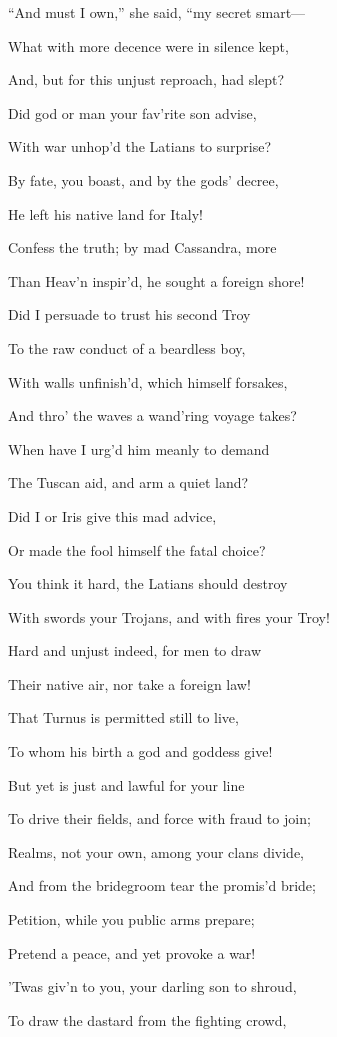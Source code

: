 “And must I own,” she said, “my secret smart—

What with more decence were in silence kept,

And, but for this unjust reproach, had slept?

Did god or man your fav’rite son advise,

With war unhop’d the Latians to surprise?

By fate, you boast, and by the gods’ decree,

He left his native land for Italy!

Confess the truth; by mad Cassandra, more

Than Heav’n inspir’d, he sought a foreign shore!

Did I persuade to trust his second Troy

To the raw conduct of a beardless boy,

With walls unfinish’d, which himself forsakes,

And thro’ the waves a wand’ring voyage takes?

When have I urg’d him meanly to demand

The Tuscan aid, and arm a quiet land?

Did I or Iris give this mad advice,

Or made the fool himself the fatal choice?

You think it hard, the Latians should destroy

With swords your Trojans, and with fires your Troy!

Hard and unjust indeed, for men to draw

Their native air, nor take a foreign law!

That Turnus is permitted still to live,

To whom his birth a god and goddess give!

But yet is just and lawful for your line

To drive their fields, and force with fraud to join;

Realms, not your own, among your clans divide,

And from the bridegroom tear the promis’d bride;

Petition, while you public arms prepare;

Pretend a peace, and yet provoke a war!

’Twas giv’n to you, your darling son to shroud,

To draw the dastard from the fighting crowd,

